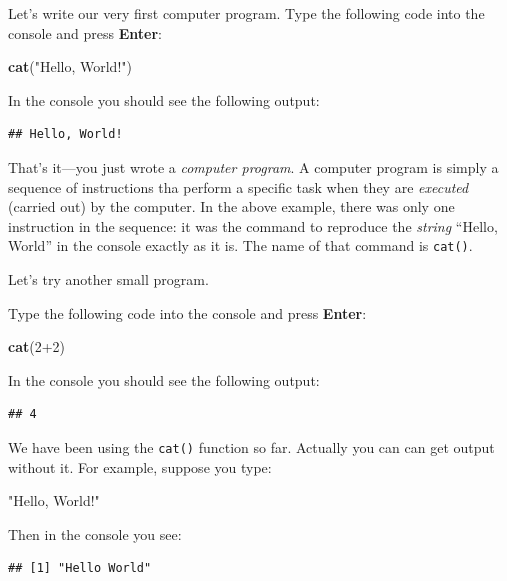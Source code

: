 \documentclass[]{book}
\makeatletter
\newenvironment{Shaded}{\begin{snugshade}}{\end{snugshade}}
\newcommand{\KeywordTok}[1]{\textcolor[rgb]{0.13,0.29,0.53}{\textbf{{#1}}}}
\newcommand{\DecValTok}[1]{\textcolor[rgb]{0.00,0.00,0.81}{{#1}}}
\newcommand{\StringTok}[1]{\textcolor[rgb]{0.31,0.60,0.02}{{#1}}}
\newcommand{\NormalTok}[1]{{#1}}
\newenvironment{kframe}{%
\medskip{}
\setlength{\fboxsep}{.8em}
 \def\at@end@of@kframe{}%
 \ifinner\ifhmode%
  \def\at@end@of@kframe{\end{minipage}}%
  \begin{minipage}{\columnwidth}%
 \fi\fi%
 \def\FrameCommand##1{\hskip\@totalleftmargin \hskip-\fboxsep
 \colorbox{shadecolor}{##1}\hskip-\fboxsep
     \hskip-\linewidth \hskip-\@totalleftmargin \hskip\columnwidth}%
 \MakeFramed {\advance\hsize-\width
   \@totalleftmargin\z@ \linewidth\hsize
   \@setminipage}}%
 {\par\unskip\endMakeFramed%
 \at@end@of@kframe}
\renewenvironment{Shaded}{\begin{kframe}}{\end{kframe}}
\theoremstyle{definition}
\theoremstyle{definition}
\theoremstyle{remark}
\makeatother
\begin{document}
Let's write our very first computer program. 
Type the following code into the console and press \textbf{Enter}:

\begin{Shaded}
\begin{Highlighting}[]
\KeywordTok{cat}\NormalTok{(}\StringTok{"Hello, World!"}\NormalTok{)}
\end{Highlighting}
\end{Shaded}

In the console you should see the following output:

\begin{verbatim}
## Hello, World!
\end{verbatim}

That's it---you just wrote a \emph{computer program}. A computer program
is simply a sequence of instructions tha perform a specific task when
they are \emph{executed} (carried out) by the computer. In the above
example, there was only one instruction in the sequence: it was the
command to reproduce the \emph{string}  ``Hello, World''
in the console exactly as it is. The name of that command is
\texttt{cat()}.

Let's try another small program.

Type the following code into the console and press \textbf{Enter}:

\begin{Shaded}
\begin{Highlighting}[]
\KeywordTok{cat}\NormalTok{(}\DecValTok{2+2}\NormalTok{)}
\end{Highlighting}
\end{Shaded}

In the console you should see the following output:

\begin{verbatim}
## 4
\end{verbatim}

We have been using the \texttt{cat()}
function so far. Actually you
can can get output without it. For example, suppose you type:

\begin{Shaded}
\begin{Highlighting}[]
\StringTok{"Hello, World!"}
\end{Highlighting}
\end{Shaded}

Then in the console you see:

\begin{verbatim}
## [1] "Hello World"
\end{verbatim}
\end{document}

